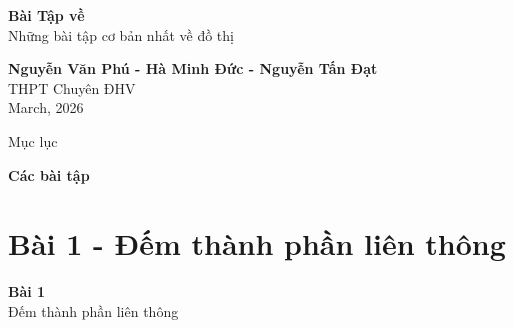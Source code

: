 \documentclass{beamer}
\begin{document}

\begin{frame}[plain]
    \centering
    \vspace{1cm}

    \begin{tcolorbox}[
            enhanced,
            colback=blue!70!black,
            colframe=blue!70!black,
            width=0.75\textwidth,
            arc=4mm,
            boxrule=0pt,
            drop shadow
        ]
        \centering
        {\color{white}\LARGE \textbf{Bài Tập về}}\\[0.2cm]
        {\color{white}\large Những bài tập cơ bản nhất về đồ thị}
    \end{tcolorbox}

    \vspace{1.2cm}

    {\Large \textbf{Nguyễn Văn Phú - Hà Minh Đức - Nguyễn Tấn Đạt}}\\[0.4cm]
    THPT Chuyên ĐHV\\[0.6cm]

    March, 2026
\end{frame}

\begin{frame}{Mục lục}
    \begin{center}
        \begin{block}{\textbf{Các bài tập}}
            \begin{center}
                \vfill
                \begin{minipage}[c][0.5\textheight][c]{0.35\textwidth}
                    \tableofcontents[sections={<+->}]
                \end{minipage}
                \vfill
            \end{center}
        \end{block}
    \end{center}
\end{frame}

\section{Bài 1 - Đếm thành phần liên thông}

\begin{frame}[plain]
    \centering
    \vspace{2cm}

    \begin{tcolorbox}[
            enhanced,
            colback=blue!60,
            colframe=blue!80!black,
            width=0.6\textwidth,
            arc=6mm,
            boxrule=0pt,
            drop shadow
        ]
        \centering
        {\color{white}\Huge \textbf{Bài 1}}\\[0.3cm]
        {\color{white}\Large Đếm thành phần liên thông}
    \end{tcolorbox}

\end{frame}
\end{document}
